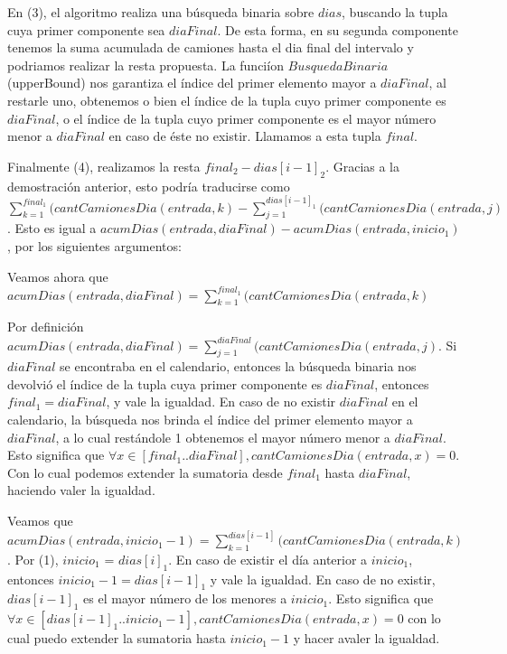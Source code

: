 \vspace{2mm}

En (3), el algoritmo realiza una b\'usqueda binaria sobre $dias$, buscando la tupla cuya primer componente sea $diaFinal$. De esta forma, en su segunda componente tenemos la suma acumulada de camiones hasta el dia final del intervalo y podriamos realizar la resta propuesta. La funci\'ion $BusquedaBinaria$ (upperBound) nos garantiza el \'indice del primer elemento mayor a $diaFinal$, al restarle uno, obtenemos o bien el \'indice de la tupla cuyo primer componente es $diaFinal$, o el \'indice de la tupla cuyo primer componente es el mayor n\'umero menor a $diaFinal$ en caso de \'este no existir. Llamamos a esta tupla $final$.

Finalmente (4), realizamos la resta $final_2 - dias[i-1]_2$. Gracias a la demostraci\'on anterior, esto podr\'ia traducirse como $ \sum_{k=1}^{final_1}(cantCamionesDia(entrada, k) - \sum_{j=1}^{dias[i-1]_1}(cantCamionesDia(entrada, j)$. Esto es igual a $acumDias(entrada, diaFinal) - acumDias(entrada, inicio_1)$, por los siguientes argumentos:

\vspace{4mm}

Veamos ahora que  $acumDias(entrada, diaFinal) = \sum_{k=1}^{final_1}(cantCamionesDia(entrada, k)$
\vspace{4mm}

Por definici\'on $acumDias(entrada, diaFinal) = \sum_{j=1}^{diaFinal}(cantCamionesDia(entrada, j)$. Si $diaFinal$ se encontraba en el calendario, entonces la b\'usqueda binaria nos devolvi\'o el \'indice de la tupla cuya primer componente es $diaFinal$, entonces $final_1 = diaFinal$, y vale la igualdad. En caso de no existir $diaFinal$ en el calendario, la b\'usqueda nos brinda el \'indice del primer elemento mayor a $diaFinal$, a lo cual rest\'andole 1 obtenemos el  mayor n\'umero menor a $diaFinal$. Esto significa que $\forall x \in [final_1 .. diaFinal], cantCamionesDia(entrada, x) = 0$. Con lo cual podemos extender la sumatoria desde $final_1$ hasta $diaFinal$, haciendo valer la igualdad.

\vspace{2mm}

Veamos que  $acumDias(entrada, inicio_1 -1) = \sum_{k=1}^{dias[i-1]}(cantCamionesDia(entrada, k)$. Por (1), $inicio_1$ = $dias[i]_1$. En caso de existir el d\'ia anterior a $inicio_1$, entonces $inicio_1 - 1 = dias[i - 1]_1$ y vale la igualdad. En caso de no existir, $dias[i-1]_1$ es el mayor n\'umero de los menores a $inicio_1$. Esto significa que $\forall x \in [dias[i-1]_1.. inicio_1-1], cantCamionesDia(entrada, x) = 0$ con lo cual puedo extender la sumatoria hasta $inicio_1-1$ y hacer avaler la igualdad.

